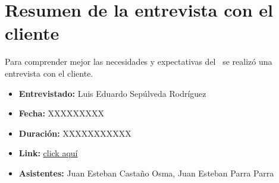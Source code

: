 \section{Resumen de la entrevista con el cliente}

Para comprender mejor las necesidades y expectativas del \GRID\, se realizó una entrevista con el cliente.

\begin{itemize}
	\item \textbf{Entrevistado:} Luis Eduardo Sepúlveda Rodríguez
	\item \textbf{Fecha:} XXXXXXXXX
	\item \textbf{Duración:} XXXXXXXXXXX
	\item \textbf{Link:} \href{https://drive.google.com}{click aquí}
	\item \textbf{Asistentes:} Juan Esteban Castaño Osma, Juan Esteban Parra Parra
\end{itemize}
